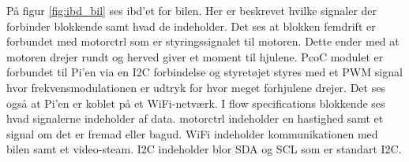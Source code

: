 På figur \ref{fig:ibd_bil} ses ibd'et for bilen. Her er beskrevet hvilke signaler der forbinder blokkende samt hvad de indeholder. Det ses at blokken femdrift er forbundet med motorctrl som er styringssignalet til motoren. Dette ender med at motoren drejer rundt og herved giver et moment til hjulene. PcoC modulet er forbundet til Pi'en via en I2C forbindelse og styretøjet styres med et PWM signal hvor frekvensmodulationen er udtryk for hvor meget forhjulene drejer. Det ses også at Pi'en er koblet på et WiFi-netværk. I flow specifications blokkende ses hvad signalerne indeholder af data. motorctrl indeholder en hastighed samt et signal om det er fremad eller bagud. WiFi indeholder kommunikationen med bilen samt et video-steam. I2C indeholder blor SDA og SCL som er standart I2C. 

\clearpage